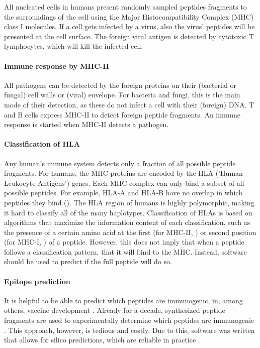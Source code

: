 All nucleated cells in humans present randomly sampled peptides
fragments to the surroundings of the cell using the Major 
Histocompatibility Complex (MHC) class I molecules.
If a cell gets infected by a virus, also the virus' peptides
will be presented at the cell surface. The foreign viral antigen is detected 
by cytotoxic T lymphocytes, which will kill the infected cell.

\paragraph{Immune response by MHC-II}

All pathogens can be detected by the foreign proteins on 
their (bacterial or fungal) cell walls or (viral) envelope.
For bacteria and fungi, this is the main mode of their detection,
as these do not infect a cell with their (foreign) DNA.
T and B cells express MHC-II to detect foreign peptide fragments.
An immune response is started when MHC-II detects a pathogen.

\paragraph{Classification of HLA}

Any human's immune system detects only a fraction of all possible
peptide fragments.
For humans, the MHC proteins are encoded by the
HLA ('Human Leukocyte Antigens') genes.
Each MHC complex can only bind a subset of all possible peptides.
For example, HLA-A and HLA-B have no overlap in which
peptides they bind (\cite{lund2004definition}).
The HLA region of humans is highly polymorphic, 
making it hard to classify all of the many haplotypes.
Classification of HLAs is based on algorithms that
maximize the information content of each 
classification, such as the presence of a certain amino acid at 
the first (for MHC-II, \cite{southwood1998several})
or second position (for MHC-I, \cite{lund2004definition}) of a peptide.
However, this does not imply that when a peptide follows
a classification pattern, that it will bind to the MHC. 
Instead, software should be used to predict if the
full peptide will do so.

\paragraph{Epitope prediction}

It is helpful to be able to predict which peptides are immunogenic,
in, among others, vaccine development . 
Already for a decade, synthesized peptide fragments are used 
to experimentally determine which peptides
are immunogenic .
This approach, however, is tedious and costly.
Due to this, software was written that allows for silico 
predictions, which are reliable in practice \cite{larsen2010identification,schellens2008unanticipated,tang2011genome}.


